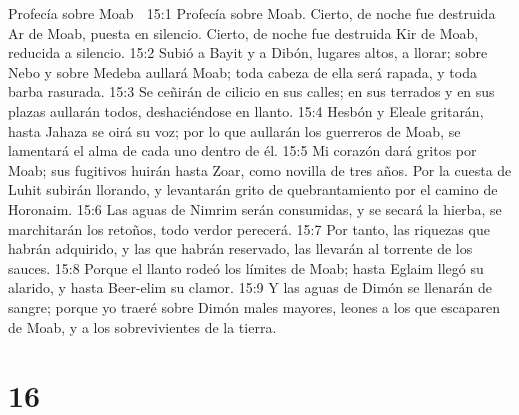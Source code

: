 Profecía sobre Moab  

15:1 Profecía sobre Moab. Cierto, de noche fue destruida Ar de Moab, puesta en silencio. Cierto, de noche fue destruida Kir de Moab, reducida a silencio.  
15:2 Subió a Bayit y a Dibón, lugares altos, a llorar; sobre Nebo y sobre Medeba aullará Moab; toda cabeza de ella será rapada, y toda barba rasurada.  
15:3 Se ceñirán de cilicio en sus calles; en sus terrados y en sus plazas aullarán todos, deshaciéndose en llanto.  
15:4 Hesbón y Eleale gritarán, hasta Jahaza se oirá su voz; por lo que aullarán los guerreros de Moab, se lamentará el alma de cada uno dentro de él.  
15:5 Mi corazón dará gritos por Moab; sus fugitivos huirán hasta Zoar, como novilla de tres años. Por la cuesta de Luhit subirán llorando, y levantarán grito de quebrantamiento por el camino de Horonaim.  
15:6 Las aguas de Nimrim serán consumidas, y se secará la hierba, se marchitarán los retoños, todo verdor perecerá.  
15:7 Por tanto, las riquezas que habrán adquirido, y las que habrán reservado, las llevarán al torrente de los sauces.  
15:8 Porque el llanto rodeó los límites de Moab; hasta Eglaim llegó su alarido, y hasta Beer-elim su clamor.  
15:9 Y las aguas de Dimón se llenarán de sangre; porque yo traeré sobre Dimón males mayores, leones a los que escaparen de Moab, y a los sobrevivientes de la tierra.  

\chapter{16}

